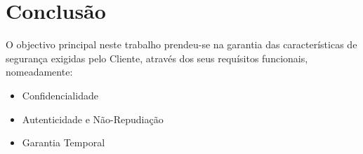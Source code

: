 \clearpage
\newpage

\chapter{Conclusão}
\label{chapter:conclusions}

O objectivo principal neste trabalho prendeu-se na garantia das características de segurança exigidas pelo Cliente, através dos seus requísitos funcionais, nomeadamente:
\begin{itemize}
\item Confidencialidade
\item Autenticidade e Não-Repudiação
\item Garantia Temporal
\end{itemize}

